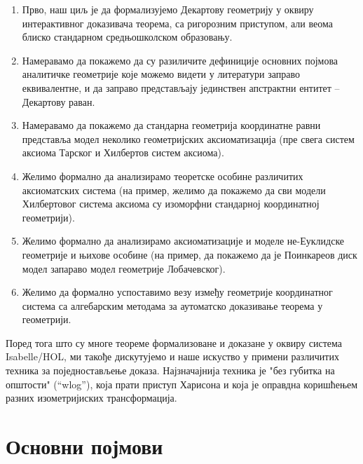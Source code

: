 \documentclass[a4paper, 12pt]{article}
\begin{document}
\begin{enumerate}
\item Прво, наш циљ је да формализујемо Декартову геометрију у оквиру
      интерактивног доказивача теорема, са ригорозним приступом, али веома блиско
      стандарном средњошколском образовању.
\item Намеравамо да покажемо да су разиличите дефиниције основних појмова
      аналитичке геометрије које можемо видети у литератури заправо еквивалентне,
      и да заправо представљају јединствен апстрактни ентитет -- Декартову раван.
\item Намеравамо да покажемо да стандарна геометрија координатне равни
      представља модел неколико геометријских аксиоматизација (пре свега
      систем аксиома Тарског и Хилбертов систем аксиома).
\item Желимо формално да анализирамо теоретске особине различитих аксиоматских система
      (на пример, желимо да покажемо да сви модели Хилбертовог система аксиома су
      изоморфни стандарној координатној геометрији).
\item Желимо формално да анализирамо аксиоматизације и моделе не-Еуклидске геометрије
      и њихове особине (на пример, да покажемо да је Поинкареов диск модел запараво модел
      геометрије Лобачевског).
\item Желимо да формално успоставимо везу између геометрије координатног система са
      алгебарским методама за аутоматско доказивање теорема у геометрији.
\end{enumerate}



Поред тога што су многе теореме формализоване и доказане у оквиру
система Isabelle/HOL, ми такође дискутујемо и наше искуство у примени
различитих техника за поједностављење доказа.  Најзначајнија техника
је "без губитка на општости" (``wlog''), која прати приступ
Харисона\cite{wlog} и која је оправдна коришћењем разних
изометријиских трансформација.

\section{Основни појмови}
\label{sec:background}
\end{document}
